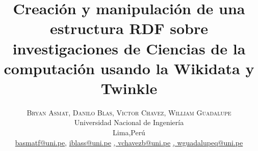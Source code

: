 \documentclass[conference]{IEEEtran}
\begin{document}
\title{\bf{Creación y manipulación de una estructura RDF sobre investigaciones de Ciencias de la computación usando la Wikidata y Twinkle}}

\author{%
\textsc{Bryan Asmat}\textsc{, Danilo Blas}\textsc{, Victor Chavez}\textsc{, William Guadalupe}\\
\normalsize Universidad Nacional de Ingeniería \\ %
\normalsize Lima,Perú \\ %
\normalsize \href{mailto:basmatf@uni.pe}{basmatf@uni.pe},  \href{mailto:iblass@uni.pe}{iblass@uni.pe} \href{mailto:vchavezb@uni.pe}{,  vchavezb@uni.pe} \href{mailto:wguadalupeq@uni.pe}{,  wguadalupeq@uni.pe} %
}





\maketitle
\end{document}
